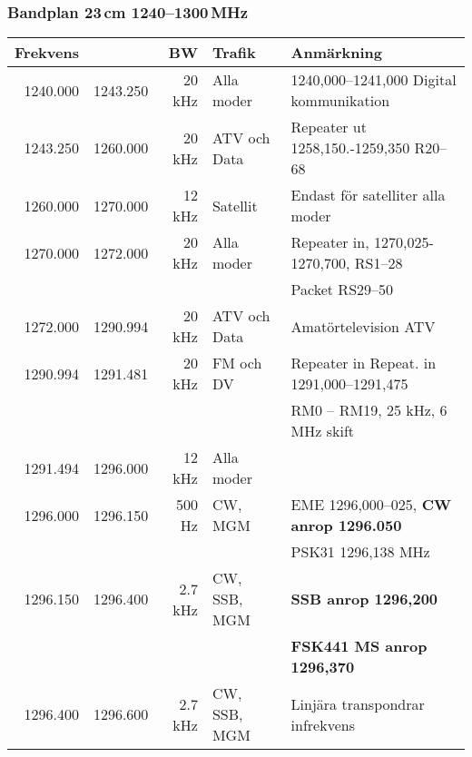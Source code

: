 \subsubsection{Bandplan 23\,cm 1240--1300\,MHz}
\begin{tabular}{rrrll}
	\textbf{Frekvens} &          & \textbf{BW} & \textbf{Trafik} & \textbf{Anmärkning}                           \\ \hline
	         1240.000 & 1243.250 &      20 kHz & Alla moder      & 1240,000--1241,000 Digital kommunikation      \\ \hline
	         1243.250 & 1260.000 &      20 kHz & ATV och Data    & Repeater ut 1258,150.-1259,350  R20--68       \\ \hline
	         1260.000 & 1270.000 &      12 kHz & Satellit        & Endast för satelliter alla moder              \\ \hline
	         1270.000 & 1272.000 &      20 kHz & Alla moder      & Repeater in, 1270,025-1270,700, RS1--28       \\
	                  &          &             &                 & Packet RS29--50                               \\ \hline
	         1272.000 & 1290.994 &      20 kHz & ATV och Data    & Amatörtelevision ATV                          \\ \hline
	         1290.994 & 1291.481 &      20 kHz & FM och DV       & Repeater in Repeat. in 1291,000--1291,475     \\
	                  &          &             &                 & RM0 – RM19, 25 kHz, 6 MHz skift               \\ \hline
	         1291.494 & 1296.000 &      12 kHz & Alla moder      &                                               \\ \hline
	         1296.000 & 1296.150 &      500 Hz & CW,  MGM        & EME 1296,000--025, \textbf{CW anrop 1296.050} \\
	                  &          &             &                 & PSK31 1296,138 MHz                            \\ \hline
	         1296.150 & 1296.400 &     2.7 kHz & CW, SSB, MGM    & \textbf{SSB anrop 1296,200}                   \\
	                  &          &             &                 & \textbf{FSK441 MS anrop 1296,370}             \\ \hline
	         1296.400 & 1296.600 &     2.7 kHz & CW, SSB, MGM    & Linjära transpondrar infrekvens               \\ \hline

\end{tabular}
